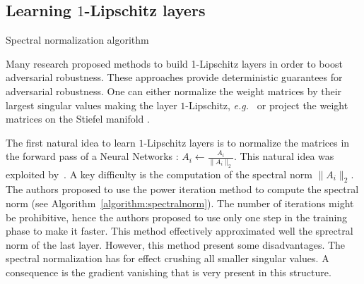  

\subsection{Learning $1$-Lipschitz layers}


\begin{algorithm}[tb]
  \caption{Spectral normalization algorithm}
  \label{algorithm:spectralnorm}
  \begin{algorithmic}
  \end{algorithmic}
  \end{algorithm}
Many research proposed methods to build 1-Lipschitz layers in order to boost adversarial robustness. These approaches provide deterministic guarantees for adversarial robustness. One can either normalize the weight matrices by their largest singular values making the layer $1$-Lipschitz, \emph{e.g.}~\citep{yoshida2017spectral,miyato2018spectral,farnia2018generalizable,anil2019sorting} or project the weight matrices on the Stiefel manifold \citep{li2019preventing,trockman2021orthogonalizing,skew2021sahil}.

The first natural idea to learn $1$-Lipschitz layers is to normalize the matrices in the forward pass of a Neural Networks : $A_i\leftarrow \frac{A_i}{\lVert A_i\rVert_2}$. This natural idea was exploited by~\citet{miyato2018spectral}. A key difficulty is the computation of the spectral norm $\lVert A_i\rVert_2$. The authors proposed to use the power iteration method to compute the spectral norm (see Algorithm~\ref{algorithm:spectralnorm}). The number of iterations might be prohibitive, hence the authors proposed to use only one step in the training phase to make it faster. This method effectively approximated well the sprectral norm of the last layer. However, this method present some disadvantages. The spectral normalization has for effect crushing all smaller singular values. A consequence is the gradient vanishing that is very present in this structure. 


